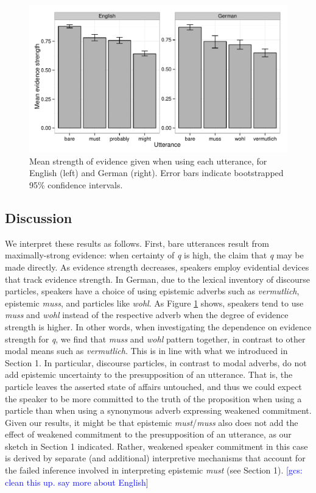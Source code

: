 \documentclass[11pt]{article}
\newcommand{\figref}[1]{Figure \ref{#1}}
\newcommand{\gcs}[1]{\textcolor{blue}{[gcs: #1]}}
\begin{document}
\begin{figure}
\centering
\includegraphics[width=.9\textwidth]{pics/mean-production-evidence}
\caption{Mean strength of evidence given when using each utterance, for English (left) and German (right). Error bars indicate bootstrapped 95\% confidence intervals.}
\label{fig:utterances-estrength}
\end{figure}


\subsection{Discussion}
We interpret these results as follows. First, bare utterances result from maximally-strong evidence: when certainty of \emph{q} is high, the claim that \emph{q} may be made directly. As evidence strength decreases, speakers employ evidential devices that track evidence strength. In German, due to the lexical inventory of discourse particles, speakers have a choice of using epistemic adverbs such as \emph{vermutlich}, epistemic \emph{muss}, and particles like \emph{wohl}. As \figref{fig:utterances-estrength} shows, speakers tend to use \emph{muss} and \emph{wohl} instead of the respective adverb when the degree of evidence strength is higher. In other words, when investigating the dependence on evidence strength for \emph{q}, we find that \emph{muss} and \emph{wohl} pattern together, in contrast to other modal means such as \emph{vermutlich}. This is in line with what we introduced in Section 1. In particular, discourse particles, in contrast to modal adverbs, do not add epistemic uncertainty to the presupposition of an utterance. That is, the particle leaves the asserted state of affairs untouched, and thus we could expect the speaker to be more committed to the truth of the proposition when using a particle than when using a synonymous adverb expressing weakened commitment. Given our results, it might be that epistemic \emph{must}/\emph{muss} also does not add the effect of weakened commitment to the presupposition of an utterance, as our sketch in Section 1 indicated. Rather, weakened speaker commitment in this case is derived by separate (and additional) interpretive mechanisms that account for the failed inference involved in interpreting epistemic \emph{must} (see Section 1). \gcs{clean this up. say more about English}
\end{document}
